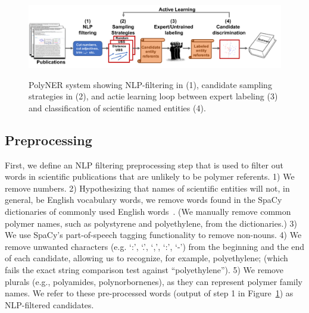 \begin{figure}[!t]
{\includegraphics[width=\textwidth]{figures/architecture.pdf}}
\caption{\label{fig:architecture} PolyNER system showing NLP-filtering in (1), candidate sampling strategies in (2), and actie learning loop between expert labeling (3) and classification of scientific named entities (4). 
}
\end{figure}

\subsection{Preprocessing}
First, we define an
NLP filtering preprocessing step that is used to filter out
words in scientific publications that are unlikely to be polymer referents. 1) We remove numbers. 2)
Hypothesizing that names of scientific entities will not, in general, be English
vocabulary words, we remove words found in the SpaCy dictionaries
of commonly used English words~\cite{choi2015depends}. (We manually remove common polymer
names, such as polystyrene and polyethylene, from the dictionaries.) 3) We use
SpaCy's part-of-speech tagging functionality to remove non-nouns. 4) We remove
unwanted characters (e.g. `:', `.', `,', `:', `-') from the beginning and the end of each
candidate, allowing us to recognize, for example, polyethylene; (which fails the
exact string comparison test against ``polyethylene''). 5) We remove plurals (e.g.,
polyamides, polynorbornenes), as they can represent polymer family names.
We refer to these pre-processed words (output of step 1 in Figure~\ref{fig:architecture}) as NLP-filtered candidates.


